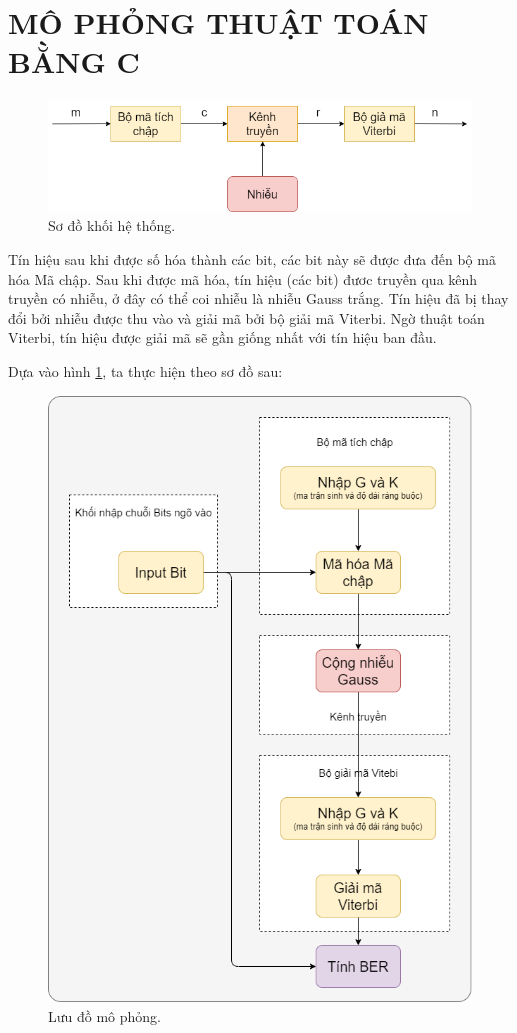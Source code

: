 \section{MÔ PHỎNG THUẬT TOÁN BẰNG C}

\begin{figure}[H]
	\centering
	\includegraphics[width=.8\linewidth]{sections/pic/mophongbangC/system_conv.png}
	\caption{Sơ đồ khối hệ thống.}
	\label{f_system_conv}
\end{figure}

Tín hiệu sau khi được số hóa thành các bit, các bit này sẽ được đưa đến bộ mã hóa Mã chập. Sau khi được mã hóa, tín hiệu (các bit) đươc truyền qua kênh truyền có nhiễu, ở đây có thể coi nhiễu là nhiễu Gauss trắng. Tín hiệu đã bị thay đổi bởi nhiễu được thu vào và giải mã bởi bộ giải mã Viterbi. Ngờ thuật toán Viterbi, tín hiệu được giải mã sẽ gần giống nhất với tín hiệu ban đầu.

Dựa vào hình \ref{f_system_conv}, ta thực hiện theo sơ đồ sau:

\begin{figure}[H]
	\centering
	\includegraphics[width=.6\linewidth]{sections/pic/mophongbangC/flowchart_diagram_withC.png}
	\caption{Lưu đồ mô phỏng.}
\end{figure}

